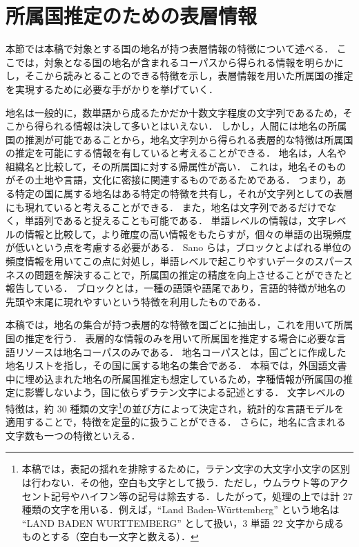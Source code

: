 \documentclass[japanese]{jnlp_1.4}
\begin{document}
\section{所属国推定のための表層情報}
\label{sec:surface-features}

本節では本稿で対象とする国の地名が持つ表層情報の特徴について述べる．
ここでは，対象となる国の地名が含まれるコーパスから得られる情報を明らかにし，そこから読みとることのできる特徴を示し，表層情報を用いた所属国の推定を実現するために必要な手がかりを挙げていく．

地名は一般的に，数単語から成るたかだか十数文字程度の文字列であるため，そこから得られる情報は決して多いとはいえない．
しかし，人間には地名の所属国の推測が可能であることから，地名文字列から得られる表層的な特徴は所属国の推定を可能にする情報を有していると考えることができる．
地名は，人名や組織名と比較して，その所属国に対する帰属性が高い．
これは，地名そのものがその土地や言語，文化に密接に関連するものであるためである．
つまり，ある特定の国に属する地名はある特定の特徴を共有し，それが文字列としての表層にも現れていると考えることができる．
また，地名は文字列であるだけでなく，単語列であると捉えることも可能である．
単語レベルの情報は，文字レベルの情報と比較して，より確度の高い情報をもたらすが，個々の単語の出現頻度が低いという点を考慮する必要がある．
Sano らは，ブロックとよばれる単位の頻度情報を用いてこの点に対処し，単語レベルで起こりやすいデータのスパースネスの問題を解決することで，所属国の推定の精度を向上させることができたと報告している\cite{tomohisa09ieice}．
ブロックとは，一種の語頭や語尾であり，言語的特徴が地名の先頭や末尾に現れやすいという特徴を利用したものである．

本稿では，地名の集合が持つ表層的な特徴を国ごとに抽出し，これを用いて所属国の推定を行う．
表層的な情報のみを用いて所属国を推定する場合に必要な言語リソースは地名コーパスのみである．
地名コーパスとは，国ごとに作成した地名リストを指し，その国に属する地名の集合である．
本稿では，外国語文書中に埋め込まれた地名の所属国推定も想定しているため，字種情報が所属国の推定に影響しないよう，国に依らずラテン文字による記述とする．
文字レベルの特徴は，約 30 種類の文字\footnote{本稿では，表記の揺れを排除するために，ラテン文字の大文字小文字の区別は行わない．その他，空白も文字として扱う．ただし，ウムラウト等のアクセント記号やハイフン等の記号は除去する．したがって，処理の上では計 27 種類の文字を用いる．例えば，``Land Baden-W\"{u}rttemberg'' という地名は ``LAND BADEN WURTTEMBERG'' として扱い，3 単語 22 文字から成るものとする（空白も一文字と数える）．}の並び方によって決定され，統計的な言語モデルを適用することで，特徴を定量的に扱うことができる．
さらに，地名に含まれる文字数も一つの特徴といえる．
\end{document}
